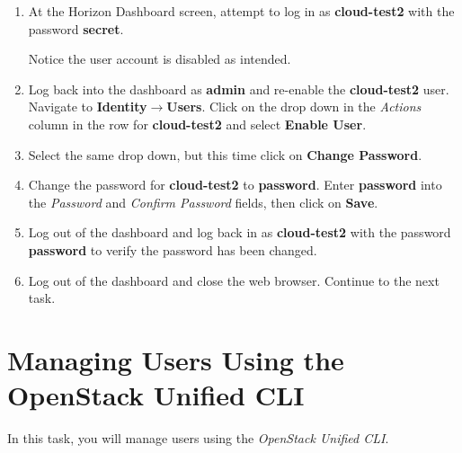 \documentclass[letterpaper, 12pt]{article}
\begin{document}
\begin{enumerate}
    \item At the Horizon Dashboard screen, attempt to log in as \textbf{cloud-test2} with the password \textbf{secret}.
    
    \begin{notebox}{}
        Notice the user account is disabled as intended.
    \end{notebox}

    \item Log back into the dashboard as \textbf{admin} and re-enable the \textbf{cloud-test2} user. Navigate to
    \textbf{Identity$\rightarrow$Users}. Click on the drop down in the \textit{Actions} column in the row for
    \textbf{cloud-test2} and select \textbf{Enable User}.

    \item Select the same drop down, but this time click on \textbf{Change Password}.
    
    \item Change the password for \textbf{cloud-test2} to \textbf{password}. Enter \textbf{password} into the
    \textit{Password} and \textit{Confirm Password} fields, then click on \textbf{Save}.

    \item Log out of the dashboard and log back in as \textbf{cloud-test2} with the password \textbf{password} to verify
    the password has been changed.

    \item Log out of the dashboard and close the web browser. Continue to the next task.
\end{enumerate}

\section{Managing Users Using the OpenStack Unified CLI}
\label{sec:managing_users_using_the_openstack_unified_cli}
In this task, you will manage users using the \textit{OpenStack Unified CLI}.
\end{document}

